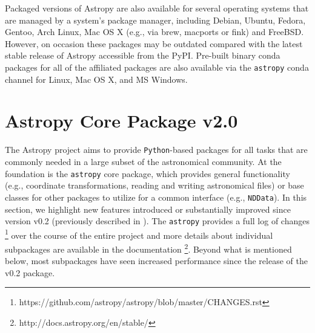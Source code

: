 \documentclass[modern]{aastex61}
\newcommand{\package}[1]{\texttt{#1}\xspace}
\newcommand{\python}{\package{Python}}
\newcommand{\astropy}{Astropy\xspace}
\newcommand{\astropypkg}{\package{astropy}}
\begin{document}
Packaged versions of \astropy are also available for several
operating systems that are managed by a system's package manager,
including Debian, Ubuntu, Fedora, Gentoo, Arch Linux, Mac OS X (e.g.,
via brew, macports or fink) and FreeBSD\@.  However, on occasion these packages
may be outdated compared with the latest stable release of \astropy accessible
from the PyPI\@. Pre-built binary conda packages for all of the affiliated packages are also available  via the \texttt{astropy} conda channel for Linux, Mac OS X, and MS Windows.
%
%




\section{Astropy Core Package v2.0}
\label{sec:core}
The \astropy project aims to provide \python-based packages for all tasks that
are commonly needed in a large subset of the astronomical community.
At the foundation is the \astropypkg core package, which provides general
functionality (e.g., coordinate transformations, reading and writing astronomical
files) or base classes for other
packages to utilize for a common interface (e.g., \texttt{NDData}).
In this section, we highlight new features introduced or substantially improved
since version v0.2 (previously described in \citealt{astropy}).  The \astropypkg
provides a full log of changes \footnote{https://github.com/astropy/astropy/blob/master/CHANGES.rst}
over the course of the entire project and more details about individual
subpackages are available in the documentation \footnote{http://docs.astropy.org/en/stable/}.
Beyond what is mentioned below, most subpackages have seen increased performance
since the release of the v0.2 package.
\end{document}
